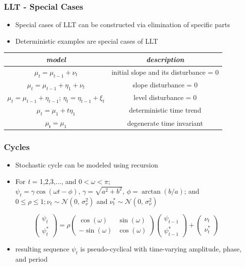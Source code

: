 \documentclass{beamer}
\begin{document}
\begin{frame}[t]\frametitle{LLT - Special Cases}
\begin{itemize}
\item Special cases of LLT can be constructed via elimination of specific parts
\item Deterministic examples are special cases of LLT
\end{itemize}
\begin{table}
\centering
\begin{tabular}{||c c||} 
 \hline
 \textit{model} &  \textit{description} \\ [0.5ex] 
 \hline\hline
 $\mu_{t} = \mu_{t-1} + \nu_{t}$ & initial slope and its disturbance = 0 \\ 
 \hline
 $\mu_{t} =  \mu_{t-1} + \eta_{1} +\nu_{t}$ & slope disturbance = 0  \\
 \hline
 $\mu_{t} =  \mu_{t-1} + \eta_{t-1}$; $\eta_{t} = \eta_{t-1} + \xi_{t}$ & level disturbance = 0  \\
 \hline
 $\mu_{t} = \mu_{1} + t\eta_{1}$ & deterministic time trend \\
 \hline
 $\mu_{ŧ} = \mu_{1}$ & degenerate time invariant \\
 \hline
\end{tabular}
\end{table}
\end{frame}

\begin{frame}[t]\frametitle{Cycles}
\begin{itemize}
\item Stochastic cycle can be modeled using recursion
\item For \textit{t} = 1,2,3,..., and $0<\omega<\pi$; \\
$\psi_{t} = \gamma\cos(\omega\textit{t} - \phi)$, $\gamma=\sqrt{a^2 + b^2}$, $\phi = \arctan(\textit{b}/\textit{a})$; and \\
$0 \leq \rho \leq 1; \nu_{t} \sim \mathcal{N}(0,\,\sigma^{2}_{\nu})$ and $\nu^*_{t} \sim \mathcal{N}(0,\,\sigma^{2}_{\nu})$
\end{itemize}
\bigskip
\begin{equation*}
\begin{pmatrix}
\psi_{t}\\
\psi^*_{t}
\end{pmatrix}
=
\rho
\begin{pmatrix}
\cos(\omega) & \sin(\omega)\\
-\sin(\omega) & \cos(\omega)
\end{pmatrix}
\begin{pmatrix}
\psi_{t-1}\\
\psi^*_{t-1}
\end{pmatrix}
+
\begin{pmatrix}
\nu_{t}\\
\nu^*_{t}
\end{pmatrix}
\end{equation*}
\begin{itemize}
\item resulting sequence $\psi_{t}$ is pseudo-cyclical with time-varying amplitude, phase, and period
\end{itemize}
\end{frame}
\end{document}
